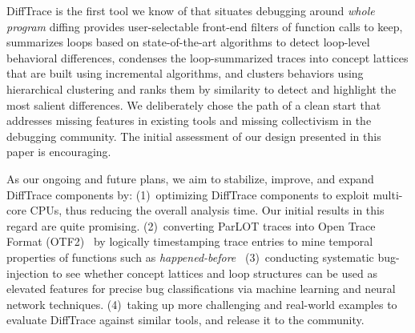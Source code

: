 DiffTrace is the first tool we know of that situates debugging around {\em whole program}
diffing provides user-selectable front-end filters of function calls to keep,
summarizes loops based on state-of-the-art algorithms to detect loop-level
behavioral differences,
condenses the loop-summarized
traces into concept lattices that are built using incremental
algorithms, and clusters behaviors using hierarchical clustering and ranks them by similarity to detect and highlight the most salient differences.
We deliberately chose the path of a clean start that addresses missing features
in existing tools and missing collectivism in the debugging community.
%
The initial assessment of our design presented in this paper is encouraging.
%

As our ongoing and future plans, we aim to stabilize, improve, and expand DiffTrace components by: 
%
%
(1)~optimizing DiffTrace components to exploit multi-core CPUs, thus reducing the overall analysis time.  Our initial results in this regard are quite promising. 
%
(2)~converting ParLOT traces into Open Trace Format (OTF2)~\cite{otf2} by logically timestamping trace entries to mine temporal properties of functions such as \textit{happened-before}~\cite{lamport}
%
(3)~conducting systematic bug-injection to see whether concept lattices and loop structures can be used as elevated features for precise bug classifications via machine learning and neural network techniques.
%
(4)~taking up more challenging and real-world examples to evaluate DiffTrace against similar tools, and release it to the community.


